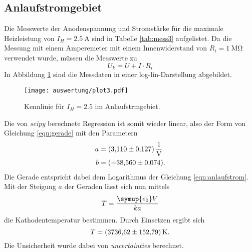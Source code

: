 \subsection{Anlaufstromgebiet}
\label{sec:anlauf}
Die Messwerte der Anodenspannung und Stromstärke für die maximale Heizleistung von $I_H=\SI{2.5}{\ampere}$ sind in Tabelle \ref{tab:mess3}
aufgelistet. Da die Messung mit einem Amperemeter mit einem Innenwiderstand von $R_i=\SI{1}{\mega\ohm}$ verwendet wurde, müssen die Messwerte
zu 
\begin{equation*}
    U_k=U+I\cdot R_i
\end{equation*}
In Abbildung \ref{fig:plot3} sind die Messdaten in einer log-lin-Darstellung abgebildet. 
\begin{figure}[H]
    \centering
    \texttt{[image: auswertung/plot3.pdf]}
    \caption{Kennlinie für $I_H=2.5$ im Anlaufstrmgebiet.}
    \label{fig:plot3}
\end{figure}
\noindent
Die von \textit{scipy} \cite{scipy} berechnete Regression ist somit wieder linear, also der Form von Gleichung \eqref{eqn:gerade} mit den Parametern
\begin{align*}
    a &= \SI{  3.11 \pm 0.127}{\per\volt}\\
    b &= \SI{-38.56 \pm 0.074}{}    .       %
\end{align*}
Die Gerade entspricht dabei dem Logarithmus der Gleichung \eqref{eqn:anlaufstrom}.
Mit der Steigung $a$ der Geraden lässt sich nun mittels
\begin{equation*}
    T=\frac{\symup{e_0}V}{ka}
\end{equation*}
die Kathodentemperatur bestimmen. Durch Einsetzen ergibt sich 
\begin{equation*}
    T=\SI{3736.62 \pm 152.79}{\kelvin}  .
\end{equation*}
Die Unsicherheit wurde dabei von \textit{uncertainties} \cite{uncertainties} berechnet. 

